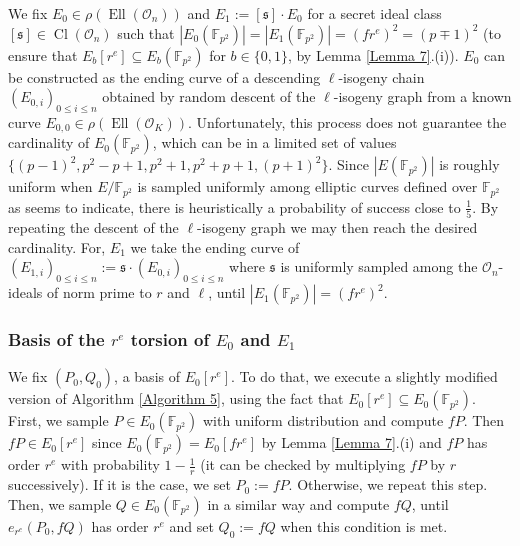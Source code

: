 \documentclass[a4paper,10pt,notitlepage]{report}
\theoremstyle{definition}
\theoremstyle{plain}
\theoremstyle{definition}
\newcommand{\F}{\mathbb{F}}
\newcommand{\mO}{\mathcal{O}}
\renewcommand{\(}{\left(}
\renewcommand{\)}{\right)}
\newcommand{\mf}[1]{\mathfrak{#1}}
\DeclareMathOperator{\Cl}{Cl}
\DeclareMathOperator{\Ell}{Ell}
\begin{document}
We fix $E_0\in\rho(\Ell(\mO_n))$ and $E_1:=[\mf{s}]\cdot E_0$ for a secret ideal class $[\mf{s}]\in\Cl(\mO_n)$ such that $|E_0(\F_{p^2})|=|E_1(\F_{p^2})|=(f r^e)^2=(p\mp 1)^2$ (to ensure that $E_b[r^e]\subseteq E_b(\F_{p^2})$ for $b\in\{0,1\}$, by Lemma \ref{Lemma 7}.(i)). $E_0$ can be constructed as the ending curve of a descending $\ell$-isogeny chain $(E_{0,i})_{0\leq i\leq n}$ obtained by random descent of the $\ell$-isogeny graph from a known curve $E_{0,0}\in\rho(\Ell(\mO_K))$.  Unfortunately, this process does not guarantee the cardinality of $E_0(\F_{p^2})$, which can be in a limited set of values $\{(p-1)^2,p^2-p+1,p^2+1,p^2+p+1,(p+1)^2\}$. Since $|E(\F_{p^2})|$ is roughly uniform when $E/\F_{p^2}$ is sampled uniformly among elliptic curves defined over $\F_{p^2}$ as \cite[Theorem 1.1]{Howe} seems to indicate, there is heuristically a probability of success close to $\frac{1}{5}$. By repeating the descent of the $\ell$-isogeny graph we may then reach the desired cardinality.  For, $E_1$ we take the ending curve of $(E_{1,i})_{0\leq i\leq n}:=\mf{s}\cdot (E_{0,i})_{0\leq i\leq n}$ where $\mf{s}$ is uniformly sampled among the $\mO_n$-ideals of norm prime to $r$ and $\ell$, until $|E_1(\F_{p^2})|=(f r^e)^2$. 

\subsubsection{Basis of the $r^e$ torsion of $E_0$ and $E_1$}

We fix $(P_0, Q_0)$, a basis of $E_0[r^e]$. To do that, we execute a slightly modified version of Algorithm \ref{Algorithm 5}, using the fact that $E_0[r^e]\subseteq E_0(\F_{p^2})$. First, we sample $P\in E_0(\F_{p^2})$ with uniform distribution and compute $fP$. Then $fP\in E_0[r^e]$ since $E_0(\F_{p^2})=E_0[fr^e]$ by Lemma \ref{Lemma 7}.(i) and $fP$ has order $r^e$ with probability $1-\frac{1}{r}$ (it can be checked by multiplying $fP$ by $r$ successively). If it is the case, we set $P_0:=fP$. Otherwise, we repeat this step. Then, we sample $Q\in E_0(\F_{p^2})$ in a similar way and compute $fQ$, until $e_{r^e}(P_0,fQ)$ has order $r^e$ and set $Q_0:=fQ$ when this condition is met.  
\end{document}
